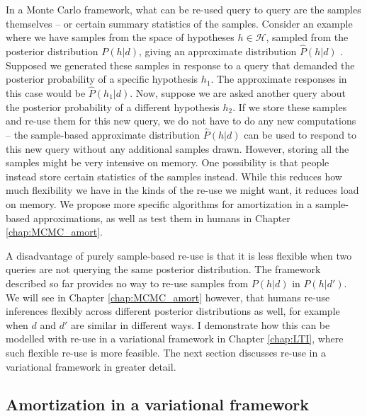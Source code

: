 In a Monte Carlo framework, what can be re-used query to query are the samples themselves -- or certain summary statistics of the samples. Consider an example where we have samples from the space of hypotheses $h \in \mathcal{H}$, sampled from the posterior distribution $P(h | d)$, giving an approximate distribution $\hat{P}(h | d)$ . Supposed we generated these samples in response to a query that demanded the posterior probability of a specific hypothesis $h_1$. The approximate responses in this case would be $\hat{P}(h_1 |d)$. Now, suppose we are asked another query about the posterior probability of a different hypothesis $h_2$. If we store these samples and re-use them for this new query, we do not have to do any new computations -- the sample-based approximate distribution $\hat{P}(h | d)$ can be used to respond to this new query without any additional samples drawn. However, storing all the samples might be very intensive on memory. One possibility is that people instead store certain statistics of the samples instead. While this reduces how much flexibility we have in the kinds of the re-use we might want, it reduces load on memory. We propose more specific algorithms for amortization in a sample-based approximations, as well as test them in humans in Chapter \ref{chap:MCMC_amort}.

A disadvantage of purely sample-based re-use is that it is less flexible when two queries are not querying the same posterior distribution. The framework described so far provides no way to re-use samples from $P(h | d)$ in $P(h | d')$. We will see in Chapter \ref{chap:MCMC_amort} however, that humans re-use inferences flexibly across different posterior distributions as well, for example when $d$ and $d'$ are similar in different ways. I demonstrate how this can be modelled with re-use in a variational framework in Chapter \ref{chap:LTI}, where such flexible re-use is more feasible. The next section discusses re-use in a variational framework in greater detail.

\subsection{Amortization in a variational framework} 

